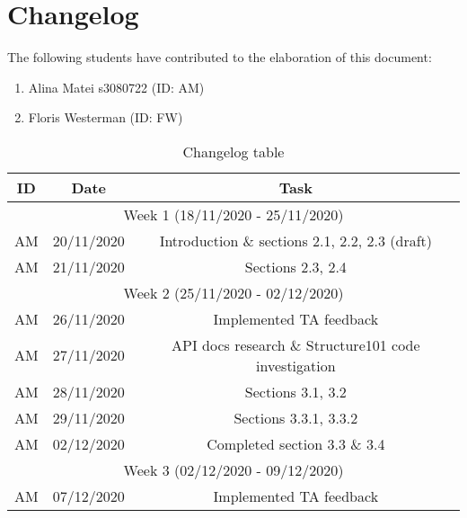 \section{Changelog}

The following students have contributed to the elaboration of this document:
\begin{enumerate}
     \item Alina Matei s3080722 (ID: AM)
    \item Floris Westerman (ID: FW)
\end{enumerate}
   
\begin{table}[H]
    \centering
    \begin{tabular}{c|c|c}
        ID & Date & Task  \\
        \hline \hline
        \multicolumn{3}{c}{Week 1 (18/11/2020 - 25/11/2020)}\\
        \hline
        AM & 20/11/2020 & Introduction \& sections 2.1, 2.2, 2.3 (draft)\\
        AM & 21/11/2020 & Sections 2.3, 2.4\\
        \hline \hline
        \multicolumn{3}{c}{Week 2 (25/11/2020 - 02/12/2020)}\\
        \hline
        AM & 26/11/2020 & Implemented TA feedback\\
        AM & 27/11/2020 & API docs research \& Structure101 code investigation\\
        AM & 28/11/2020 & Sections 3.1, 3.2 \\
        AM & 29/11/2020 & Sections 3.3.1, 3.3.2\\
        AM & 02/12/2020 & Completed section 3.3 \& 3.4\\
        \hline \hline
        \multicolumn{3}{c}{Week 3 (02/12/2020 - 09/12/2020)}\\
        \hline
        AM & 07/12/2020 & Implemented TA feedback\\
    \end{tabular}
    \caption{Changelog table}
    \label{tab:changelog}
\end{table}